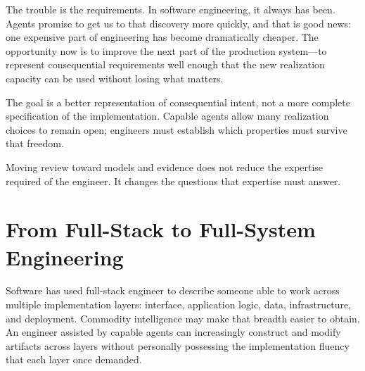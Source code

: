 
The trouble is the requirements. In software engineering, it always has been\citep{brooks1987}. Agents promise to get us to that discovery more quickly, and that is good news: one expensive part of engineering has become dramatically cheaper. The opportunity now is to improve the next part of the production system---to represent consequential requirements well enough that the new realization capacity can be used without losing what matters.


The goal is a better representation of consequential intent, not a more complete specification of the implementation. Capable agents allow many realization choices to remain open; engineers must establish which properties must survive that freedom.


Moving review toward models and evidence does not reduce the expertise required of the engineer. It changes the questions that expertise must answer.

\section{From Full-Stack to Full-System Engineering}\label{heading:from-full-stack-to-full-system-engineering}


Software has used full-stack engineer to describe someone able to work across multiple implementation layers: interface, application logic, data, infrastructure, and deployment. Commodity intelligence may make that breadth easier to obtain. An engineer assisted by capable agents can increasingly construct and modify artifacts across layers without personally possessing the implementation fluency that each layer once demanded.

